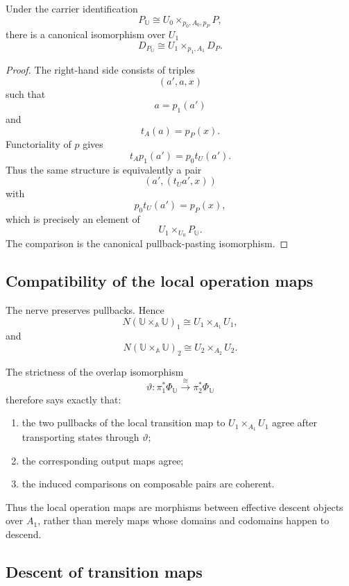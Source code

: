 \begin{lemma}
\label{lem:derivative-domains-input-pullback}
Under the carrier identification
\[
    P_{\mathbb U}
    \cong
    U_0\times_{p_0,A_0,p_P}P,
\]
there is a canonical isomorphism over \(U_1\)
\[
    D_{P_{\mathbb U}}
    \cong
    U_1\times_{p_1,A_1}D_P.
\]
\end{lemma}

\begin{proof}
The right-hand side consists of triples
\[
    (a',a,x)
\]
such that
\[
    a=p_1(a')
\]
and
\[
    t_A(a)=p_P(x).
\]
Functoriality of \(p\) gives
\[
    t_Ap_1(a')
    =
    p_0t_U(a').
\]
Thus the same structure is equivalently a pair
\[
    (a',(t_Ua',x))
\]
with
\[
    p_0t_U(a')=p_P(x),
\]
which is precisely an element of
\[
    U_1\times_{U_0}P_{\mathbb U}.
\]
The comparison is the canonical pullback-pasting isomorphism.
\end{proof}

\subsection{Compatibility of the local operation maps}
\label{subsec:compatibility-local-operation-maps}

The nerve preserves pullbacks. Hence
\[
    N(\mathbb U\times_{\mathbb A}\mathbb U)_1
    \cong
    U_1\times_{A_1}U_1,
\]
and
\[
    N(\mathbb U\times_{\mathbb A}\mathbb U)_2
    \cong
    U_2\times_{A_2}U_2.
\]

The strictness of the overlap isomorphism
\[
    \vartheta:
    \pi_1^\ast\Phi_{\mathbb U}
    \xrightarrow{\cong}
    \pi_2^\ast\Phi_{\mathbb U}
\]
therefore says exactly that:
\begin{enumerate}
    \item the two pullbacks of the local transition map to
    \(U_1\times_{A_1}U_1\) agree after transporting states through
    \(\vartheta\);
    \item the corresponding output maps agree;
    \item the induced comparisons on composable pairs are coherent.
\end{enumerate}

Thus the local operation maps are morphisms between effective descent objects
over \(A_1\), rather than merely maps whose domains and codomains happen to
descend.

\subsection{Descent of transition maps}
\label{subsec:descent-transition-maps-rigorous}

